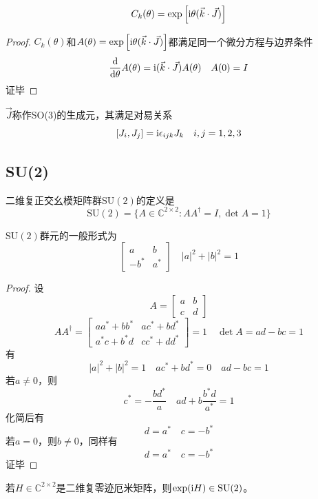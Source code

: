 \begin{theorem}
    $$C_k(\theta)=\exp\left[\mathrm{i}\theta(\vec{k}\cdot\vec{J})\right]$$
\end{theorem}
\begin{proof}
    $C_k(\theta)$和$A(\theta)=\exp\left[\mathrm{i}\theta(\vec{k}\cdot\vec{J})\right]$都满足同一个微分方程与边界条件
    $$\frac{\mathrm{d}}{\mathrm{d}\theta}A(\theta)=\mathrm{i}(\vec{k}\cdot\vec{J})A(\theta)\quad A(0)=I$$
    证毕
\end{proof}
$\vec{J}$称作SO(3)的生成元，其满足对易关系
$$[J_i,J_j]=\mathrm{i}\epsilon_{ijk}J_k\quad i,j=1,2,3$$
\subsection{SU(2)}
二维复正交幺模矩阵群$\mathrm{SU}(2)$的定义是
$$\mathrm{SU}(2)=\{A\in\mathbb{C}^{2\times 2}:AA^\dagger=I,\det A=1\}$$
\begin{theorem}\label{SU2_form}
    $\mathrm{SU}(2)$群元的一般形式为
    $$\left[\begin{array}{cc}
    a&b\\
    -b^*&a^*
\end{array}\right]\quad |a|^2+|b|^2=1$$
\end{theorem}
\begin{proof}
设
$$A=\left[\begin{array}{cc}
    a&b\\
    c&d
\end{array}\right]$$
$$AA^\dagger=\left[\begin{array}{cc}
    aa^*+bb^*&ac^*+bd^*\\
    a^*c+b^*d&cc^*+dd^*
\end{array}\right]=1\quad \det A=ad-bc=1$$
有
$$|a|^2+|b|^2=1\quad ac^*+bd^*=0\quad ad-bc=1$$
若$a\neq 0$，则
$$c^*=-\frac{bd^*}{a}\quad ad+b\frac{b^* d}{a^*}=1$$
化简后有
$$d=a^*\quad c=-b^*$$
若$a=0$，则$b\neq 0$，同样有
$$d=a^*\quad c=-b^*$$
证毕
\end{proof}
\begin{theorem}
    若$H\in\mathbb{C}^{2\times2}$是二维复零迹厄米矩阵，则$\exp(\mathrm{i} H)\in\mathrm{SU}(2)$。
\end{theorem}
